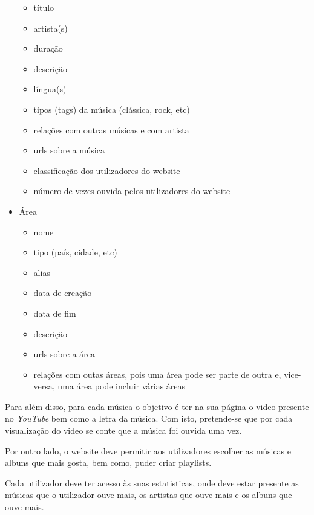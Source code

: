 \documentclass{article}
\begin{document}
\begin{itemize}
        \begin{itemize}
            \item título
            \item artista(s)
            \item duração
            \item descrição
            \item língua(s)
            \item tipos (tags) da música (clássica, rock, etc)
            \item relações com outras músicas e com artista
            \item urls sobre a música
            \item classificação dos utilizadores do website
            \item número de vezes ouvida pelos utilizadores do website
        \end{itemize}
    \item Área
        \begin{itemize}
            \item nome
            \item tipo (país, cidade, etc)
            \item alias
            \item data de creação
            \item data de fim
            \item descrição
            \item urls sobre a área
            \item relações com outas áreas, pois uma área pode ser parte de outra e, vice-versa, uma área pode incluir várias áreas
        \end{itemize}
\end{itemize}

Para além disso, para cada música o objetivo é ter na sua página o video presente no \textit{YouTube} bem como a letra da música. Com isto, pretende-se que por cada visualização do video se conte que a música foi ouvida uma vez.

Por outro lado, o website deve permitir aos utilizadores escolher as músicas e albuns que mais gosta, bem como, puder criar playlists.

Cada utilizador deve ter acesso às suas estatisticas, onde deve estar presente as músicas que o utilizador ouve mais, os artistas que ouve mais e os albuns que ouve mais.
\end{document}
